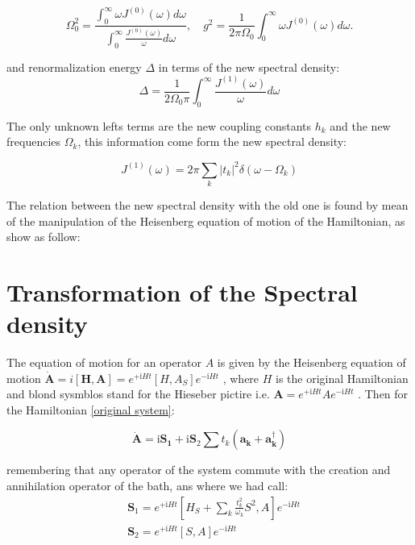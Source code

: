 \documentclass[%
preprint,
onecolumn,
notitlepag,
 amsmath,amssymb,
 aps,
 pra,
]{revtex4-2}
\begin{document}
\begin{itemize}
\begin{equation}
\Omega_{0}^{2}=\frac{\int_{0}^{\infty} \omega J^{(0)}(\omega) d \omega}{\int_{0}^{\infty} \frac{J^{(0)}(\omega)}{\omega} d \omega}, \quad g^{2}=\frac{1}{2 \pi \Omega_{0}} \int_{0}^{\infty} \omega J^{(0)}(\omega) d \omega .
\end{equation}

and renormalization energy $\Delta$ in terms of the new spectral density: 
\begin{equation}
    \Delta =\frac{1}{2 \Omega_0 \pi} \int_{0}^{\infty} \frac{J^{(1)}(\omega)}{\omega} d \omega
\end{equation}

The only unknown lefts terms are the new coupling constants $h_k$ and the new frequencies $\Omega_k$, this information come form the new spectral density:

\begin{equation}
    J^{(1)} (\omega) =2 \pi \sum_k |t_k|^2 \delta(\omega-\Omega_k)
\end{equation}

The relation between  the new spectral density  with the old one is found by mean of the manipulation of the Heisenberg equation of motion of the Hamiltonian, as show as follow:

\section{Transformation of the Spectral density}

The equation of motion for an operator $A$ is given by the Heisenberg equation of motion $ \dot{\boldsymbol{A}} =i \left[ \boldsymbol{ H } , \boldsymbol{A} \right] =e^{+\mathrm{i} H t}\left[H, A_{S}\right] e^{-\mathrm{i} H t} $  , where $H$ is the original Hamiltonian and blond sysmblos stand for the Hieseber pictire i.e. $  \boldsymbol{ A } = e^{+\mathrm{i} H t} A e^{-\mathrm{i} H t} $ . Then for the Hamiltonian \eqref{original system}: 

\begin{equation}
\dot{\boldsymbol{A}}=\mathrm{i} \boldsymbol{S}_{\mathbf{1}}+\mathrm{i} \boldsymbol{S}_{2} \sum t_{k}\left(\boldsymbol{a}_{\boldsymbol{k}}+\boldsymbol{a}_{\boldsymbol{k}}^{\dagger}\right)
\end{equation}


remembering that any operator of the system commute with the creation and annihilation operator of the bath, ans where we had call: 
\begin{equation}
\begin{aligned}
&\boldsymbol{S}_{1}=e^{+\mathrm{i} H t}\left[H_{S}+\sum_{k} \frac{t_{k}^{2}}{\omega_{k}} S^{2}, A\right] e^{-\mathrm{i} H t} \\
&\boldsymbol{S}_{2}=e^{+\mathrm{i} H t}[S, A] e^{-\mathrm{i} H t}
\end{aligned}
\end{equation}




\end{itemize}
\end{document}

